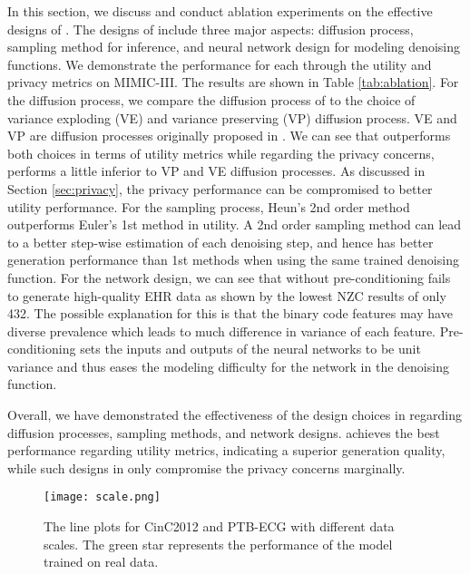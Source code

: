 In this section, we discuss and conduct ablation experiments on the effective designs of \modelname. The designs of \modelname include three major aspects: diffusion process, sampling method for inference, and neural network design for modeling denoising functions. We demonstrate the performance for each through the utility and privacy metrics on MIMIC-III. The results are shown in Table \ref{tab:ablation}. For the diffusion process, we compare the diffusion process of \modelname to the choice of variance exploding (VE) and variance preserving (VP) diffusion process. VE and VP are diffusion processes originally proposed in \citet{song2021scorebased}. We can see that \modelname outperforms both choices in terms of utility metrics while regarding the privacy concerns, \modelname performs a little inferior to VP and VE diffusion processes. As discussed in Section \ref{sec:privacy}, the privacy performance can be compromised to better utility performance. For the sampling process, Heun's 2nd order method outperforms Euler's 1st method in utility. A 2nd order sampling method can lead to a better step-wise estimation of each denoising step, and hence has better generation performance than 1st methods when using the same trained denoising function. For the network design, we can see that \modelname without pre-conditioning fails to generate high-quality EHR data as shown by the lowest NZC results of only 432. The possible explanation for this is that the binary code features may have diverse prevalence which leads to much difference in variance of each feature. Pre-conditioning sets the inputs and outputs of the neural networks to be unit variance and thus eases the modeling difficulty for the network in the denoising function.  

Overall, we have demonstrated the effectiveness of the design choices in \modelname regarding diffusion processes, sampling methods, and network designs. \modelname achieves the best performance regarding utility metrics, indicating a superior generation quality, while such designs in \modelname only compromise the privacy concerns marginally. 

\begin{figure*}[t]
    \begin{center}
    \texttt{[image: scale.png]}
    \end{center}
    \caption{The line plots for CinC2012 and PTB-ECG with different data scales. The green star represents the performance of the model trained on real data.}
    \label{fig: scale}
\end{figure*}


